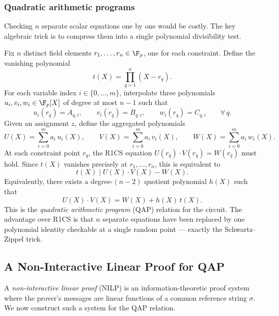 \subsubsection*{Quadratic arithmetic programs}

Checking $n$ separate scalar equations one by one would be costly. The key algebraic trick is to compress them into a single polynomial divisibility test.

Fix $n$ distinct field elements $r_1, \ldots, r_n \in \F_p$, one for each constraint. Define the vanishing polynomial
\[
  t(X) = \prod_{q=1}^{n}(X - r_q).
\]
For each variable index $i \in \{0, \ldots, m\}$, interpolate three polynomials $u_i, v_i, w_i \in \F_p[X]$ of degree at most $n-1$ such that
\[
  u_i(r_q) = A_{q,i}, \qquad v_i(r_q) = B_{q,i}, \qquad w_i(r_q) = C_{q,i} \qquad \forall\, q.
\]
Given an assignment $z$, define the aggregated polynomials
\[
  U(X) = \sum_{i=0}^{m} a_i\, u_i(X), \qquad
  V(X) = \sum_{i=0}^{m} a_i\, v_i(X), \qquad
  W(X) = \sum_{i=0}^{m} a_i\, w_i(X).
\]
At each constraint point $r_q$, the R1CS equation $U(r_q)\cdot V(r_q) = W(r_q)$ must hold. Since $t(X)$ vanishes precisely at $r_1, \ldots, r_n$, this is equivalent to
\[
  \boxed{t(X) \;\Big|\; U(X)\cdot V(X) - W(X).}
\]
Equivalently, there exists a degree-$(n-2)$ quotient polynomial $h(X)$ such that
\[
  U(X)\cdot V(X) = W(X) + h(X)\,t(X).
\]
This is the \emph{quadratic arithmetic program} (QAP) relation for the circuit. The advantage over R1CS is that $n$ separate equations have been replaced by one polynomial identity checkable at a single random point --- exactly the Schwartz--Zippel trick.

\subsection{A Non-Interactive Linear Proof for QAP}

A \emph{non-interactive linear proof} (NILP) is an information-theoretic proof system where the prover's messages are linear functions of a common reference string $\sigma$. We now construct such a system for the QAP relation.


